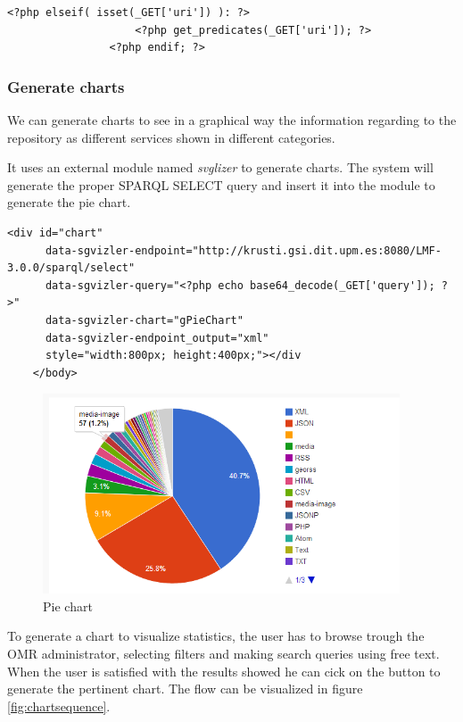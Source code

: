 \begin{lstlisting}[breaklines=true, style=mono, caption="Creating information view"]
				<?php elseif( isset(_GET['uri']) ): ?>
					<?php get_predicates(_GET['uri']); ?>				
				<?php endif; ?>
\end{lstlisting}

\subsubsection{Generate charts}
We can generate charts to see in a graphical way the information regarding to the repository as different services shown in different categories.

It uses an external module named \textit{svglizer} to generate charts. The system will generate the proper SPARQL SELECT query and insert it into the module to generate the pie chart.

\begin{lstlisting}[breaklines=true, style=mono, caption="Generating pie charts"]
<div id="chart"
      data-sgvizler-endpoint="http://krusti.gsi.dit.upm.es:8080/LMF-3.0.0/sparql/select"
      data-sgvizler-query="<?php echo base64_decode(_GET['query']); ?>"
      data-sgvizler-chart="gPieChart"
      data-sgvizler-endpoint_output="xml" 
      style="width:800px; height:400px;"></div
	</body>
\end{lstlisting}

\begin{figure}[h]
	\centering
	\includegraphics[width=300pt]{graphics/piechart.png}
	\caption{Pie chart}
	\label{fig:piechart}
\end{figure}

To generate a chart to visualize statistics, the user has to browse trough the OMR administrator, selecting filters and making search queries using free text. When the user is satisfied with the results showed he can cick on the button to generate the pertinent chart. The flow can be visualized in figure \ref{fig:chartsequence}.

